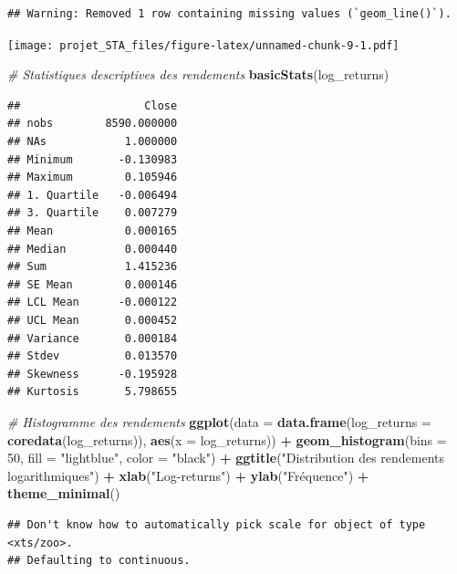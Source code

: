 \documentclass[
]{article}
\newenvironment{Shaded}{\begin{snugshade}}{\end{snugshade}}
\newcommand{\AttributeTok}[1]{\textcolor[rgb]{0.13,0.29,0.53}{#1}}
\newcommand{\CommentTok}[1]{\textcolor[rgb]{0.56,0.35,0.01}{\textit{#1}}}
\newcommand{\DecValTok}[1]{\textcolor[rgb]{0.00,0.00,0.81}{#1}}
\newcommand{\FunctionTok}[1]{\textcolor[rgb]{0.13,0.29,0.53}{\textbf{#1}}}
\newcommand{\NormalTok}[1]{#1}
\newcommand{\SpecialCharTok}[1]{\textcolor[rgb]{0.81,0.36,0.00}{\textbf{#1}}}
\newcommand{\StringTok}[1]{\textcolor[rgb]{0.31,0.60,0.02}{#1}}
\begin{document}
\begin{verbatim}
## Warning: Removed 1 row containing missing values (`geom_line()`).
\end{verbatim}

\texttt{[image: projet\_STA\_files/figure-latex/unnamed-chunk-9-1.pdf]}

\begin{Shaded}
\begin{Highlighting}[]
\CommentTok{\# Statistiques descriptives des rendements}
\FunctionTok{basicStats}\NormalTok{(log\_returns)}
\end{Highlighting}
\end{Shaded}

\begin{verbatim}
##                   Close
## nobs        8590.000000
## NAs            1.000000
## Minimum       -0.130983
## Maximum        0.105946
## 1. Quartile   -0.006494
## 3. Quartile    0.007279
## Mean           0.000165
## Median         0.000440
## Sum            1.415236
## SE Mean        0.000146
## LCL Mean      -0.000122
## UCL Mean       0.000452
## Variance       0.000184
## Stdev          0.013570
## Skewness      -0.195928
## Kurtosis       5.798655
\end{verbatim}

\begin{Shaded}
\begin{Highlighting}[]
\CommentTok{\# Histogramme des rendements}
\FunctionTok{ggplot}\NormalTok{(}\AttributeTok{data =} \FunctionTok{data.frame}\NormalTok{(}\AttributeTok{log\_returns =} \FunctionTok{coredata}\NormalTok{(log\_returns)), }\FunctionTok{aes}\NormalTok{(}\AttributeTok{x =}\NormalTok{ log\_returns)) }\SpecialCharTok{+}
  \FunctionTok{geom\_histogram}\NormalTok{(}\AttributeTok{bins =} \DecValTok{50}\NormalTok{, }\AttributeTok{fill =} \StringTok{"lightblue"}\NormalTok{, }\AttributeTok{color =} \StringTok{"black"}\NormalTok{) }\SpecialCharTok{+}
  \FunctionTok{ggtitle}\NormalTok{(}\StringTok{"Distribution des rendements logarithmiques"}\NormalTok{) }\SpecialCharTok{+}
  \FunctionTok{xlab}\NormalTok{(}\StringTok{"Log{-}returns"}\NormalTok{) }\SpecialCharTok{+}
  \FunctionTok{ylab}\NormalTok{(}\StringTok{"Fréquence"}\NormalTok{) }\SpecialCharTok{+}
  \FunctionTok{theme\_minimal}\NormalTok{()}
\end{Highlighting}
\end{Shaded}

\begin{verbatim}
## Don't know how to automatically pick scale for object of type <xts/zoo>.
## Defaulting to continuous.
\end{verbatim}
\end{document}
